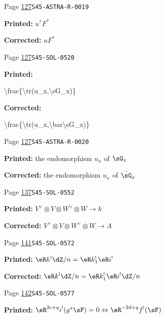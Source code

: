 \documentclass[oneside]{book}
\theoremstyle{sga-source}
\theoremstyle{sga-source-dash}
\theoremstyle{sga-source-dotdash}
\theoremstyle{sga-source-number-note-dash}
\theoremstyle{sga-source-note-number-dotdash}
\theoremstyle{sga-source-example-dotdash}
\theoremstyle{sga-source-inline-number}
\theoremstyle{sga-source-bare-number}
\theoremstyle{sga-source}
\begin{document}
\begin{description}
\smallskip
\item[\hypertarget{apparatus:EN-0064}{64}] Page \hyperlink{printpage:en:127}{127}\quad\texttt{S45-ASTRA-R-0019}
\par\noindent\textbf{Printed:} \(u^* F^*\)
\par\noindent\textbf{Corrected:} \(u F^*\)
\smallskip
\item[\hypertarget{apparatus:EN-0065}{65}] Page \hyperlink{printpage:en:127}{127}\quad\texttt{S45-SOL-0520}
\par\noindent\textbf{Printed:} {\footnotesize\ttfamily\raggedright \textbackslash{}\allowbreak{}frac\{\allowbreak{}\textbackslash{}\allowbreak{}tr(\allowbreak{}u\_\allowbreak{}x,\allowbreak{}\textbackslash{}\allowbreak{}sG\_\allowbreak{}x)\allowbreak{}\}\allowbreak{}\par}
\par\noindent\textbf{Corrected:} {\footnotesize\ttfamily\raggedright \textbackslash{}\allowbreak{}frac\{\allowbreak{}\textbackslash{}\allowbreak{}tr(\allowbreak{}u\_\allowbreak{}x,\allowbreak{}\textbackslash{}\allowbreak{}bar\textbackslash{}\allowbreak{}sG\_\allowbreak{}x)\allowbreak{}\}\allowbreak{}\par}
\smallskip
\item[\hypertarget{apparatus:EN-0066}{66}] Page \hyperlink{printpage:en:127}{127}\quad\texttt{S45-ASTRA-R-0020}
\par\noindent\textbf{Printed:} the endomorphism $u_x$ of $\sG_x$
\par\noindent\textbf{Corrected:} the endomorphism $u_x$ of $\bar\sG_x$
\smallskip
\item[\hypertarget{apparatus:EN-0067}{67}] Page \hyperlink{printpage:en:137}{137}\quad\texttt{S45-SOL-0552}
\par\noindent\textbf{Printed:} \(V^\vee\otimes V\otimes W^\vee\otimes W\to k\)
\par\noindent\textbf{Corrected:} \(V^\vee\otimes V\otimes W^\vee\otimes W\to A\)
\smallskip
\item[\hypertarget{apparatus:EN-0068}{68}] Page \hyperlink{printpage:en:141}{141}\quad\texttt{S45-SOL-0572}
\par\noindent\textbf{Printed:} \(\eR k^! \dZ/n=\eR k_1^! \eR i^!\)
\par\noindent\textbf{Corrected:} \(\eR k^! \dZ/n=\eR k_1^! \eR i^!\dZ/n\)
\smallskip
\item[\hypertarget{apparatus:EN-0069}{69}] Page \hyperlink{printpage:en:142}{142}\quad\texttt{S45-SOL-0577}
\par\noindent\textbf{Printed:} \(\eR^{2 c+q} i^!(g^*\sF)=0\Leftrightarrow \eR^{-2 d+q}f^!(\sF)\)

\end{description}
\end{document}

